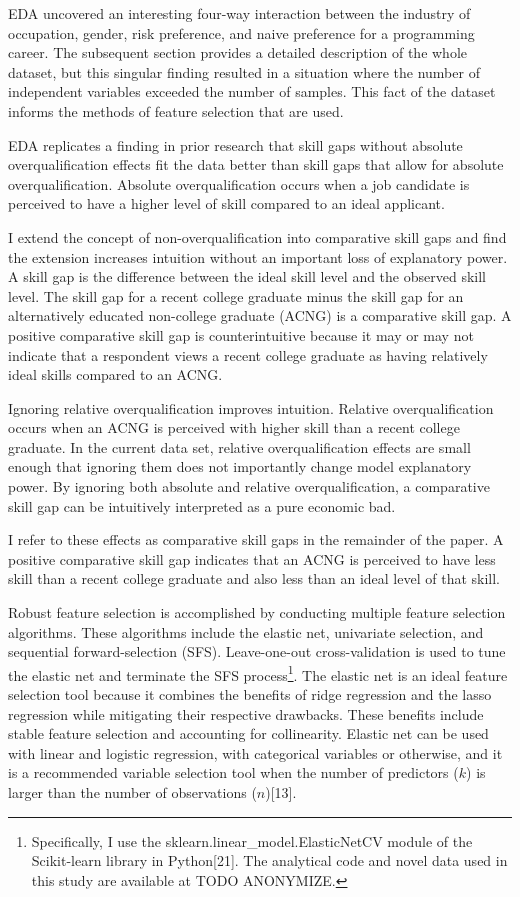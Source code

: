 \documentclass[review]{elsarticle}
\begin{document}
EDA uncovered an interesting four-way interaction between
the industry of occupation, gender, risk preference, and naive preference for a programming career.
The subsequent section provides a detailed description of the whole dataset,
but this singular finding resulted in a situation where the number of independent variables exceeded the number of samples.
This fact of the dataset informs the methods of feature selection that are used.

EDA replicates a finding in prior research that skill gaps without absolute overqualification effects
fit the data better than skill gaps that allow for absolute overqualification. %
Absolute overqualification occurs when a job candidate is perceived to have a higher level of skill
compared to an ideal applicant.

I extend the concept of non-overqualification into comparative skill gaps and find the extension increases intuition without an important loss of explanatory power.
A skill gap is the difference between the ideal skill level and the observed skill level.
The skill gap for a recent college graduate minus the skill gap for an alternatively educated non-college graduate (ACNG) is a comparative skill gap.
A positive comparative skill gap is counterintuitive because it may or may not indicate that a
respondent views a recent college graduate as having relatively ideal skills compared to an ACNG.

Ignoring relative overqualification improves intuition.
Relative overqualification occurs when an ACNG is perceived with higher skill than a recent college graduate.
In the current data set, relative overqualification effects are small enough that ignoring them does not importantly change model explanatory power.
By ignoring both absolute and relative overqualification,
a comparative skill gap can be intuitively interpreted as a pure economic bad.

I refer to these effects as comparative skill gaps in the remainder of the paper.
A positive comparative skill gap
indicates that an ACNG is perceived to have less skill than a recent college graduate
and also less than an ideal level of that skill.

Robust feature selection is accomplished by conducting multiple feature selection algorithms.
These algorithms include the elastic net, univariate selection, and sequential forward-selection (SFS).
Leave-one-out cross-validation is used to tune the elastic net and terminate the SFS process\footnote{
    Specifically, I use the sklearn.linear_model.ElasticNetCV module of the Scikit-learn library in Python[21].
    The analytical code and novel data used in this study are available at TODO ANONYMIZE.
}.
The elastic net is an ideal feature selection tool because it combines the benefits of ridge regression and the lasso regression
while mitigating their respective drawbacks.
These benefits include stable feature selection and accounting for collinearity.
Elastic net can be used with linear and logistic regression, with categorical variables or otherwise,
and it is a recommended variable selection tool
when the number of predictors ($k$) is larger than the number of observations ($n$)[13].
\end{document}
